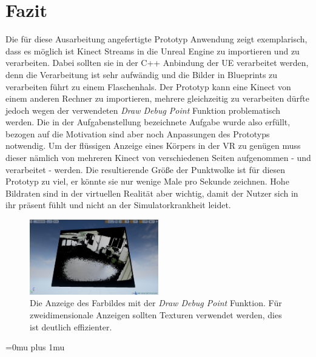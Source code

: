 \documentclass[a4paper]{IEEEtran}
\begin{document}
\section{Fazit}
	Die für diese Ausarbeitung angefertigte Prototyp Anwendung zeigt exemplarisch, dass es möglich ist Kinect Streams in die Unreal Engine zu importieren und zu verarbeiten.
	Dabei sollten sie in der C++ Anbindung der UE verarbeitet werden, denn die Verarbeitung ist sehr aufwändig und die Bilder in Blueprints zu verarbeiten führt zu einem Flaschenhals.
	Der Prototyp kann eine Kinect von einem anderen Rechner zu importieren, mehrere gleichzeitig zu verarbeiten dürfte jedoch wegen der verwendeten {\textit{Draw Debug Point}} Funktion problematisch werden. 
	Die in der Aufgabenstellung bezeichnete Aufgabe wurde also erfüllt, bezogen auf die Motivation sind aber noch Anpassungen des Prototyps notwendig.
	Um der flüssigen Anzeige eines Körpers in der VR zu genügen muss dieser nämlich von mehreren Kinect von verschiedenen Seiten aufgenommen - und verarbeitet - werden. 
	Die resultierende Größe der Punktwolke ist für diesen Prototyp zu viel, er könnte sie nur wenige Male pro Sekunde zeichnen. 
	Hohe Bildraten sind in der virtuellen Realität aber wichtig, damit der Nutzer sich in ihr präsent fühlt und nicht an der Simulatorkrankheit leidet. \\[0.5cm]
	
	\begin{figure}[!h]
    	\centering
		\includegraphics[width=0.5\textwidth]{img/2DColor}
	    \caption{Die Anzeige des Farbildes mit der {\textit{Draw Debug Point}} Funktion. Für zweidimensionale Anzeigen sollten Texturen verwendet werden, dies ist deutlich effizienter.}
    	\label{2DColor}
	\end{figure} 
	


\Urlmuskip=0mu plus 1mu\relax


\end{document}
